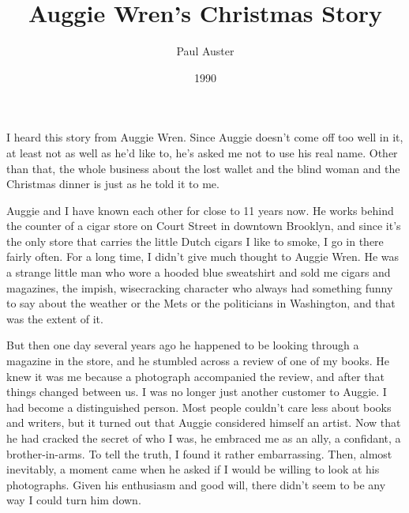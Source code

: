 \documentclass[10pt,a4paper]{article}
\begin{document}
\title{Auggie Wren's Christmas Story}
\date{1990}
\author{Paul Auster}
\maketitle
    
\thispagestyle{plain}
\setcounter{page}{1}
\linenumbers
\noindent I heard this story from Auggie Wren. Since Auggie doesn't come off too well in it, at least not as well as he'd like to, he's asked me not to use his real name. Other than that, the whole business about the lost wallet and the blind woman and the Christmas dinner is just as he told it to me.

Auggie and I have known each other for close to 11 years now. He works behind the counter of a cigar store on Court Street in downtown Brooklyn, and since it's the only store that carries the little Dutch cigars I like to smoke, I go in there fairly often. For a long time, I didn't give much thought to Auggie Wren. He was a strange little man who wore a hooded blue sweatshirt and sold me cigars and magazines, the impish, wisecracking character who always had something funny to say about the weather or the Mets or the politicians in Washington, and that was the extent of it.

But then one day several years ago he happened to be looking through a magazine in the store, and he stumbled across a review of one of my books. He knew it was me because a photograph accompanied the review, and after that things changed between us. I was no longer just another customer to Auggie. I had become a distinguished person. Most people couldn't care less about books and writers, but it turned out that Auggie considered himself an artist. Now that he had cracked the secret of who I was, he embraced me as an ally, a confidant, a brother-in-arms. To tell the truth, I found it rather embarrassing. Then, almost inevitably, a moment came when he asked if I would be willing to look at his photographs. Given his enthusiasm and good will, there didn't seem to be any way I could turn him down.
\end{document}
